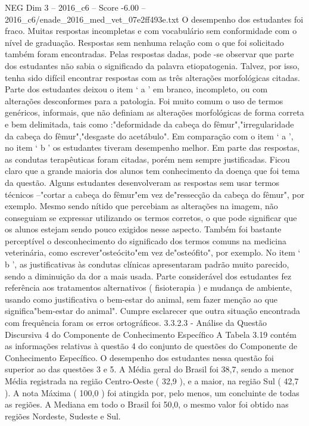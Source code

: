 \begin{textsample}{NEG Dim 3 – 2016\_c6 – Score -6.00 – 2016\_c6/enade\_2016\_med\_vet\_07e2ff493e.txt}
O desempenho dos estudantes foi fraco.
Muitas respostas incompletas e com vocabulário sem conformidade com o nível de graduação.
Respostas sem nenhuma relação com o que foi solicitado também foram encontradas.
Pelas respostas dadas, pode -se observar que parte dos estudantes não sabia o significado da palavra etiopatogenia.
Talvez, por isso, tenha sido difícil encontrar respostas com as três alterações morfológicas citadas.
Parte dos estudantes deixou o item ‘ a ’ em branco, incompleto, ou com alterações desconformes para a patologia.
Foi muito comum o uso de termos genéricos, informais, que não definiam as alterações morfológicas de forma correta e bem delimitada, tais como :"deformidade da cabeça do fêmur","irregularidade da cabeça do fêmur","desgaste do acetábulo".
Em comparação com o item ‘ a ’, no item ‘ b ’ os estudantes tiveram desempenho melhor.
Em parte das respostas, as condutas terapêuticas foram citadas, porém nem sempre justificadas.
Ficou claro que a grande maioria dos alunos tem conhecimento da doença que foi tema da questão.
Alguns estudantes desenvolveram as respostas sem usar termos técnicos –"cortar a cabeça do fêmur"em vez de"ressecção da cabeça do fêmur", por exemplo.
Mesmo sendo nítido que percebiam as alterações na imagem, não conseguiam se expressar utilizando os termos corretos, o que pode significar que os alunos estejam sendo pouco exigidos nesse aspecto.
Também foi bastante perceptível o desconhecimento do significado dos termos comuns na medicina veterinária, como escrever"osteócito"em vez de"osteófito", por exemplo.
No item ‘ b ’, as justificativas às condutas clínicas apresentaram padrão muito parecido, sendo a diminuição da dor a mais usada.
Parte considerável dos estudantes fez referência aos tratamentos alternativos ( fisioterapia ) e mudança de ambiente, usando como justificativa o bem-estar do animal, sem fazer menção ao que significa"bem-estar do animal".
Cumpre esclarecer que outra situação encontrada com frequência foram os erros ortográficos. 3.3.2.3 - Análise da Questão Discursiva 4 do Componente de Conhecimento Específico A Tabela 3.19 contém as informações relativas à questão 4 do conjunto de questões do Componente de Conhecimento Específico.
O desempenho dos estudantes nessa questão foi superior ao das questões 3 e 5.
A Média geral do Brasil foi 38,7, sendo a menor Média registrada na região Centro-Oeste ( 32,9 ), e a maior, na região Sul ( 42,7 ).
A nota Máxima ( 100,0 ) foi atingida por, pelo menos, um concluinte de todas as regiões.
A Mediana em todo o Brasil foi 50,0, o mesmo valor foi obtido nas regiões Nordeste, Sudeste e Sul.

\end{textsample}
